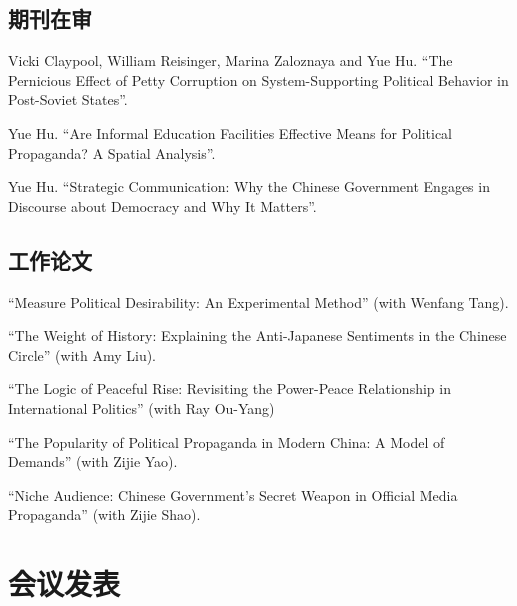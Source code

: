 \documentclass[10.5pt,]{article}
\begin{document}
\subsection{期刊在审}

Vicki Claypool, William Reisinger, Marina Zaloznaya and Yue Hu. ``The
Pernicious Effect of Petty Corruption on System-Supporting Political
Behavior in Post-Soviet States''.

Yue Hu. ``Are Informal Education Facilities Effective Means for
Political Propaganda? A Spatial Analysis''.

Yue Hu. ``Strategic Communication: Why the Chinese Government Engages in
Discourse about Democracy and Why It Matters''.

\subsection{工作论文}

``Measure Political Desirability: An Experimental Method'' (with Wenfang
Tang).

``The Weight of History: Explaining the Anti-Japanese Sentiments in the
Chinese Circle'' (with Amy Liu).

``The Logic of Peaceful Rise: Revisiting the Power-Peace Relationship in
International Politics'' (with Ray Ou-Yang)

``The Popularity of Political Propaganda in Modern China: A Model of
Demands'' (with Zijie Yao).

``Niche Audience: Chinese Government's Secret Weapon in Official Media
Propaganda'' (with Zijie Shao).

\section{会议发表}
\end{document}
